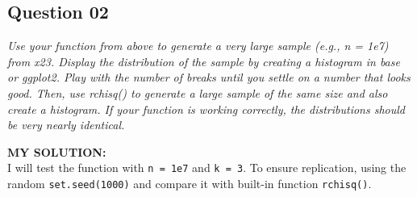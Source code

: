 \documentclass[
]{article}
\begin{document}
\hypertarget{question-02}{%
\subsection{Question 02}\label{question-02}}

\emph{Use your function from above to generate a very large sample
(e.g., n = 1e7) from x23. Display the distribution of the sample by
creating a histogram in base or ggplot2. Play with the number of breaks
until you settle on a number that looks good. Then, use rchisq() to
generate a large sample of the same size and also create a histogram. If
your function is working correctly, the distributions should be very
nearly identical.}

\textbf{MY SOLUTION:}\\
I will test the function with \texttt{n\ =\ 1e7} and \texttt{k\ =\ 3}.
To ensure replication, using the random \texttt{set.seed(1000)} and
compare it with built-in function \texttt{rchisq()}.
\end{document}
